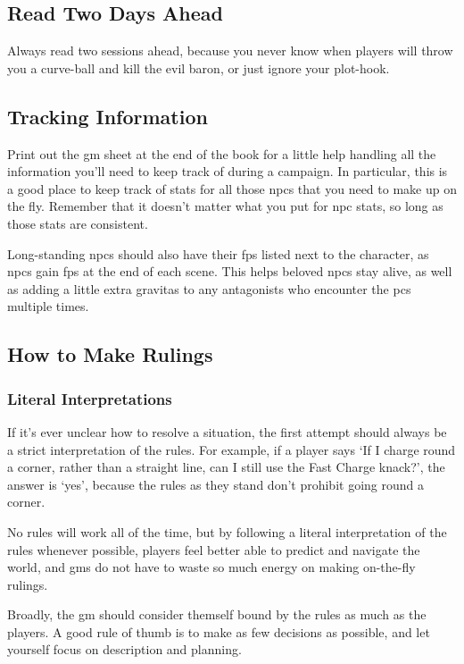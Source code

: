 \begin{multicols}{2}
\subsection{Read Two Days Ahead}

Always read two sessions ahead, because you never know when players will throw you a curve-ball and kill the evil baron, or just ignore your plot-hook.

\subsection{Tracking Information}

Print out the \gls{gm} sheet at the end of the book for a little help handling all the information you'll need to keep track of during a campaign.
In particular, this is a good place to keep track of stats for all those \glspl{npc} that you need to make up on the fly.
Remember that it doesn't matter what you put for \gls{npc} stats, so long as those stats are consistent.

Long-standing \glspl{npc} should also have their \glspl{fp} listed next to the character, as \glspl{npc} gain \glspl{fp} at the end of each scene.
This helps beloved \glspl{npc} stay alive, as well as adding a little extra gravitas to any antagonists who encounter the \glspl{pc} multiple times.

\subsection{How to Make Rulings}

\subsubsection{Literal Interpretations}

If it's ever unclear how to resolve a situation, the first attempt should always be a strict interpretation of the rules.
For example, if a player says `If I charge round a corner, rather than a straight line, can I still use the Fast Charge knack?', the answer is `yes', because the rules as they stand don't prohibit going round a corner.

No rules will work all of the time, but by following a literal interpretation of the rules whenever possible, players feel better able to predict and navigate the world, and \glspl{gm} do not have to waste so much energy on making on-the-fly rulings.

Broadly, the \gls{gm} should consider themself bound by the rules as much as the players.
A good rule of thumb is to make as few decisions as possible, and let yourself focus on description and planning.


\end{multicols}
